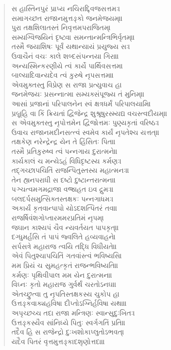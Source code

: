 \documentclass[a4paper,12pt]{article}
\begin{document}
\begin{verse}
સ હાસ્તિનપુરં પ્રાપ્ય નચિરાદ્દ્વિજસત્તમઃ। \\
સમાગચ્છત રાજાનમુત્તઙ્કો જનમેજયમ્॥ \\
પુરા તક્ષશિલાતસ્તં નિવૃત્તમપરાજિતમ્। \\
સમ્યગ્વિજયિનં દૃષ્ટ્વા સમન્તાન્મન્ત્રિભિર્વૃતમ્॥ \\
તસ્મૈ જયાશિષઃ પૂર્વં યથાન્યાયં પ્રયુજ્ય સઃ। \\
ઉવાચૈનં વચઃ કાલે શબ્દસંપન્નયા ગિરા॥ \\
અન્યસ્મિન્કરણીયે ત્વં કાર્યે પાર્થિવસત્તમ। \\
બાલ્યાદિવાન્યદેવ ત્વં કુરુષે નૃપસત્તમ॥ \\
એવમુક્તસ્તુ વિપ્રેણ સ રાજા પ્રત્યુવાચ હ। \\
જનમેજયઃ પ્રસન્નાત્મા સમ્યક્સંપૂજ્ય તં મુનિમ્॥ \\
આસાં પ્રજાનાં પરિપાલનેન સ્વં ક્ષત્રધર્મં પરિપાલયામિ। \\
પ્રબ્રૂહિ વા કિં ક્રિયતાં દ્વિજેન્દ્ર શુશ્રૂષુરસ્મ્યદ્ય વચસ્ત્વદીયમ્॥ \\
સ એવમુક્તસ્તુ નૃપોત્તમેન દ્વિજોત્તમઃ પુણ્યકૃતાં વરિષ્ઠઃ। \\
ઉવાચ રાજાનમદીનસત્ત્વં સ્વમેવ કાર્યં નૃપતેશ્ચ યત્તત્॥ \\
તક્ષકેણ નરેન્દ્રેન્દ્ર યેન તે હિંસિતઃ પિતા। \\
તસ્મૈ પ્રતિકુરુષ્વ ત્વં પન્નગાય દુરાત્મને॥ \\
કાર્યકાલં ચ મન્યેઽહં વિધિદૃષ્ટસ્ય કર્મણઃ। \\
તદ્ગચ્છાપચિતિં રાજન્પિતુસ્તસ્ય મહાત્મનઃ॥ \\
તેન હ્યનપરાધી સ દષ્ટો દુષ્ટાન્તરાત્મના। \\
પઞ્ચત્વમગમદ્રાજા વજ્રાહત ઇવ દ્રુમઃ॥ \\
બલદર્પસમુત્સિક્તસ્તક્ષકઃ પન્નગાધમઃ। \\
અકાર્યં કૃતવાન્પાપો યોઽદશત્પિતરં તવ॥ \\
રાજર્ષિવંશગોપ્તારમમરપ્રતિમં નૃપમ્। \\
જઘાન કાશ્યપં ચૈવ ન્યવર્તયત પાપકૃત્॥ \\
દગ્ધુમર્હસિ તં પાપં જ્વલિતે હવ્યવાહને। \\
સર્પસત્રે મહારાજ ત્વયિ તદ્ધિ વિધીયતે॥ \\
એવં પિતુશ્ચાપચિતિં ગતવાંસ્ત્વં ભવિષ્યસિ। \\
મમ પ્રિયં ચ સુમહત્કૃતં રાજન્ભવિષ્યતિ॥ \\
કર્મણઃ પૃથિવીપાલ મમ યેન દુરાત્મના। \\
વિઘ્નઃ કૃતો મહારાજ ગુર્વર્થં ચરતોઽનઘ॥ \\
એતચ્છ્રુત્વા તુ નૃપતિસ્તક્ષકસ્ય ચુકોપ હ। \\
ઉત્તઙ્કવાક્યહવિષા દીપ્તોઽગ્નિર્હવિષા યથા॥ \\
અપૃચ્છચ્ચ તદા રાજા મન્ત્રિણઃ સ્વાન્સુદુઃખિતઃ। \\
ઉત્તઙ્કસ્યૈવ સાંનિધ્યે પિતુઃ સ્વર્ગગતિં પ્રતિ॥ \\
તદૈવ હિ સ રાજેન્દ્રો દુઃખશોકાપ્લુતોઽભવત્। \\
યદૈવ પિતરં વૃત્તમુત્તઙ્કાદશૃણોત્તદા॥ \\
\end{verse}
\end{document}
